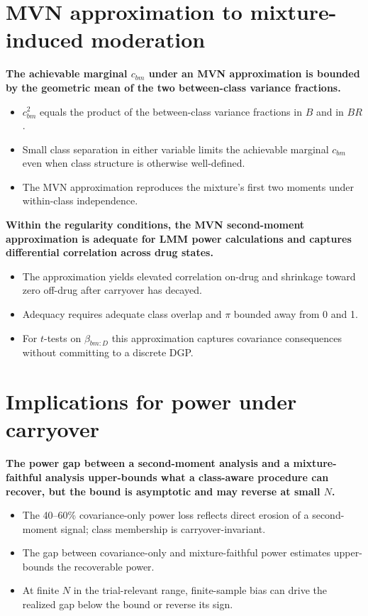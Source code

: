 \documentclass[
  11pt,
]{article}
\begin{document}
\section{MVN approximation to mixture-induced moderation}\label{mvn-approximation-to-mixture-induced-moderation}

\textbf{The achievable marginal $c_{bm}$ under an MVN approximation
is bounded by the geometric mean of the two between-class variance
fractions.}

\begin{itemize}\setlength{\itemsep}{2pt}\setlength{\parskip}{0pt}
\item $c_{bm}^2$ equals the product of the between-class variance
  fractions in $B$ and in $BR$.
\item Small class separation in either variable limits the achievable
  marginal $c_{bm}$ even when class structure is otherwise
  well-defined.
\item The MVN approximation reproduces the mixture's first two moments
  under within-class independence.
\end{itemize}

\textbf{Within the regularity conditions, the MVN second-moment
approximation is adequate for LMM power calculations and captures
differential correlation across drug states.}

\begin{itemize}\setlength{\itemsep}{2pt}\setlength{\parskip}{0pt}
\item The approximation yields elevated correlation on-drug and
  shrinkage toward zero off-drug after carryover has decayed.
\item Adequacy requires adequate class overlap and $\pi$ bounded
  away from 0 and 1.
\item For $t$-tests on $\beta_{bm:D}$ this approximation captures
  covariance consequences without committing to a discrete DGP.
\end{itemize}

\section{Implications for power under carryover}\label{implications-for-power-under-carryover}

\textbf{The power gap between a second-moment analysis and a
mixture-faithful analysis upper-bounds what a class-aware procedure
can recover, but the bound is asymptotic and may reverse at small $N$.}

\begin{itemize}\setlength{\itemsep}{2pt}\setlength{\parskip}{0pt}
\item The 40--60\% covariance-only power loss reflects direct erosion
  of a second-moment signal; class membership is carryover-invariant.
\item The gap between covariance-only and mixture-faithful power
  estimates upper-bounds the recoverable power.
\item At finite $N$ in the trial-relevant range, finite-sample bias
  can drive the realized gap below the bound or reverse its sign.
\end{itemize}
\end{document}
